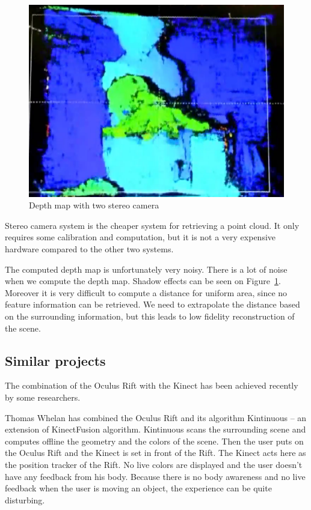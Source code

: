 \documentclass[12pt, twoside]{article}
\begin{document}
\begin{figure}[h]
  \centering
  \includegraphics[scale=0.3]{EtronDepth.png}
  \caption{\label{fig:etron} Depth map with two stereo camera}
\end{figure}

Stereo camera system is the cheaper system for retrieving a point cloud. It only requires some calibration and computation, but it is not a very expensive hardware compared to the other two systems.

The computed depth map is unfortunately very noisy. There is a lot of noise when we compute the depth map. Shadow effects can be seen on Figure~\ref{fig:etron}. Moreover it is very difficult to compute a distance for uniform area, since no feature information can be retrieved. We need to extrapolate the distance based  on the surrounding information, but this leads to low fidelity reconstruction of the scene.

\subsection{Similar projects}
The combination of the Oculus Rift with the Kinect has been achieved recently by some researchers.

Thomas Whelan has combined the Oculus Rift and its algorithm Kintinuous \cite{KinRift} -- an extension of KinectFusion algorithm. Kintinuous scans the surrounding scene and computes offline the geometry and the colors of the scene. Then the user puts on the Oculus Rift and the Kinect is set in front of the Rift. The Kinect acts here as the position tracker of the Rift. No live colors are displayed and the user doesn't have any feedback from his body. Because there is no body awareness and no live feedback when the user is moving an object, the experience can be quite disturbing.
\end{document}
